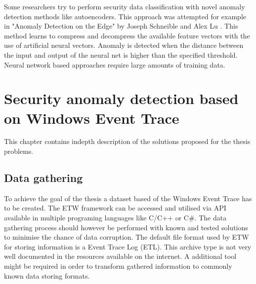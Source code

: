 \documentclass[a4paper,twoside,12pt]{book}
\begin{document}
Some researchers try to perform security
data classification with novel anomaly detection methods like autoencoders. This approach was
attempted for example in "Anomaly Detection on the Edge" by Joseph Schneible and Alex Lu
\cite{bib:autoencoderDist}. This method learns to compress and decompress the available feature 
vectors with the use of artificial neural vectors. Anomaly is detected when the distance 
between the input and output of the neural net is higher than the specified threshold.
Neural network based approaches require large amounts of training data.  




\chapter{Security anomaly detection based on Windows Event Trace}

This chapter contains indepth description of the solutions proposed for the thesis problems. 

\section{Data gathering}
To achieve the goal of the thesis a dataset based of the Windows Event Trace has to 
be created. The ETW framework can be accessed and utilised via API available in multiple
programing languages like C/C++\cite{bib:etwcpp} or C\#\cite{bib:etwcsharp}. The 
data gathering process should however be performed with known and tested solutions to
minimise the chance of data corruption. The default file format used by ETW for storing 
information is a Event Trace Log (ETL). This archive type is not very well documented in 
the resources available on the internet. A additional tool might be required in order to 
transform gathered information to commonly known data storing formats.
\end{document}
